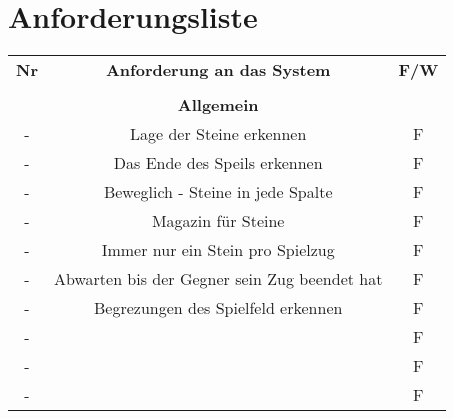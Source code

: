	\chapter*{Anforderungsliste}
	\begin{table}[hbt]
	\centering
	\label{Anforderungsliste}
	\begin{tabular}{ccc}
		\textbf{Nr} & \textbf{Anforderung an das System} & \textbf{F/W} \\
		\textbf{} & \textbf{}& \textbf{}  \\
		\hline
		\hline
		\textbf{} & \textbf{Allgemein}& \textbf{}  \\
		\hline
		\hline
		- & Lage der Steine erkennen & F\\
		\hline
		- & Das Ende des Speils erkennen & F\\
		\hline
		- & Beweglich - Steine in jede Spalte	& F\\
		\hline
		- &Magazin für Steine  & F\\
		\hline
		- & Immer nur ein Stein pro Spielzug & F\\
		\hline
		- &  Abwarten bis der Gegner sein Zug beendet hat& F\\
		\hline
			- &  Begrezungen des Spielfeld erkennen& F\\
		\hline
			- &  & F\\
		\hline
			- &  & F\\
		\hline
			- &  & F\\
		\hline
		
	\end{tabular}
\end{table}